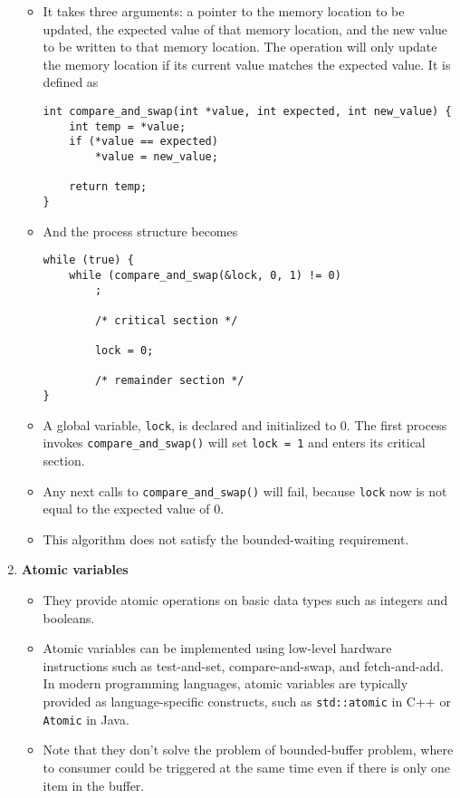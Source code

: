 \documentclass{report}
\def\code#1{\texttt{#1}}
\begin{document}
\begin{enumerate}
\begin{itemize}
		      \item It takes three arguments: a pointer to the memory location
		            to be updated, the expected value of that memory location, and the new value to be written
		            to that memory location. The operation will only update the memory location if its current value
		            matches the expected value. It is defined as
                \begin{verbatim}
int compare_and_swap(int *value, int expected, int new_value) {
    int temp = *value;
    if (*value == expected)
        *value = new_value;

    return temp;
}
\end{verbatim}
          \item And the process structure becomes
              \begin{verbatim}
while (true) {
    while (compare_and_swap(&lock, 0, 1) != 0)
        ;

        /* critical section */

        lock = 0;

        /* remainder section */
}
\end{verbatim}
          \item A global variable, \code{lock}, is declared and initialized to 0. The first process invokes
                \code{compare\_and\_swap()} will set \code{lock = 1} and enters its critical section.
          \item Any next calls to \code{compare\_and\_swap()} will fail, because \code{lock} now is not
                equal to the expected value of 0.
          \item This algorithm does not satisfy the bounded-waiting requirement.
	      \end{itemize}

	\item \textbf{Atomic variables}
        \begin{itemize}
          \item They provide atomic operations on basic data types such as integers and booleans.
          \item Atomic variables can be implemented using low-level hardware instructions such as
                test-and-set, compare-and-swap, and fetch-and-add. In modern
                programming languages, atomic variables are typically provided as language-specific constructs,
                such as \code{std::atomic} in C++ or \code{Atomic} in Java.
          \item Note that they don't solve the problem of bounded-buffer problem, where to consumer could be triggered
                at the same time even if there is only one item in the buffer.
        \end{itemize}
\end{enumerate}
\end{document}
